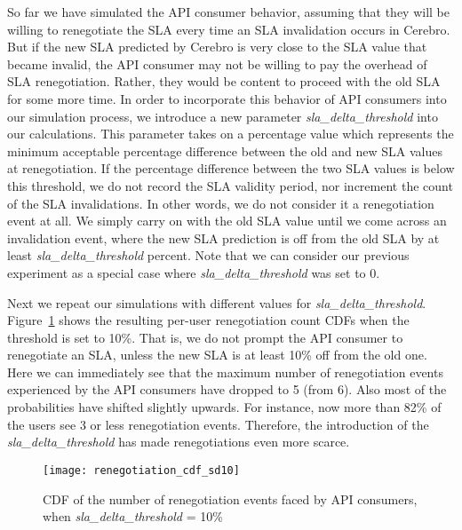 So far we have simulated the API consumer behavior, assuming that they will be willing to renegotiate the
SLA every time an SLA invalidation occurs in Cerebro. But if the new SLA predicted by Cerebro is very
close to the SLA value that became invalid, the API consumer may not be willing to pay the overhead of
SLA renegotiation. Rather, they would be content to proceed with the old SLA for some more time. In order
to incorporate this behavior of API consumers into our simulation process, we introduce a new parameter 
\textit{sla\_delta\_threshold} into our calculations. This parameter takes on a percentage value which
represents the minimum acceptable percentage difference between the old and new SLA values at renegotiation.
If the percentage difference between the two SLA values is below this threshold, we do not record the
SLA validity period, nor increment the count of the SLA invalidations. In other words, we do not consider
it a renegotiation event at all. We simply carry on with the
old SLA value until we come across an invalidation event, where the new SLA prediction is off from the
old SLA by at least \textit{sla\_delta\_threshold} percent. Note that we can consider our previous experiment
as a special case where \textit{sla\_delta\_threshold} was set to 0.

Next we repeat our simulations with different values for \textit{sla\_delta\_threshold}. Figure~\ref{fig:renegotiation_cdf_sd10}
shows the resulting per-user renegotiation count CDFs when the threshold is set to 10\%. That is, we 
do not prompt the API consumer to renegotiate an SLA, unless the new SLA is at least 10\% off from the old one.
Here we can immediately see that the maximum number of renegotiation events experienced by the API
consumers have dropped to 5 (from 6). Also most of the probabilities have shifted slightly upwards. For instance,
now more than 82\% of the users see 3 or less renegotiation events. Therefore, the introduction of the
\textit{sla\_delta\_threshold} has made renegotiations even more scarce.

\begin{figure}
\centering
\texttt{[image: renegotiation\_cdf\_sd10]}
\caption{CDF of the number of renegotiation events faced by API consumers, when  \textit{sla\_delta\_threshold} = 10\%}
\label{fig:renegotiation_cdf_sd10}
\vspace{-0.2in}
\end{figure}